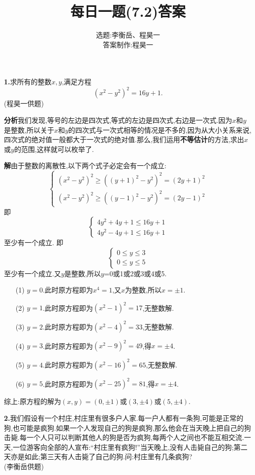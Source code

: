 \documentclass{article}
\title{每日一题(7.2)答案}
\author{选题:李衡岳、程昊一\\答案制作:程昊一}
\begin{document}
\maketitle
{
\textbf{1.}求所有的整数$x,y$,满足方程
\[(x^2-y^2)^2=16y+1.\]
(程昊一供题)}
\par\textbf{分析}\quad 我们发现,等号的左边是四次式,等式的左边是四次式,右边是一次式.因为$x$和$y$是整数,所以关于$x$和$y$的四次式与一次式相等的情况是不多的,因为从大小关系来说,四次式的绝对值一般都大于一次式的绝对值.那么,我们运用\textbf{不等估计}的方法,求出$x$或$y$的范围,这样就可以枚举了.
\par\textbf{解}\quad 由于整数的离散性,以下两个式子必定会有一个成立:
\[\begin{cases}
\left(x^2-y^2\right)^2\ge\left((y+1)^2-y^2\right)^2=(2y+1)^2\\
\left(x^2-y^2\right)^2\ge\left((y-1)^2-y^2\right)^2=(2y-1)^2
\end{cases}\]
即
\[\begin{cases}
4y^2+4y+1\le 16y+1\\
4y^2-4y+1\le 16y+1
\end{cases}\]
至少有一个成立.
即
\[\begin{cases}
0\le y\le 3\\
0\le y\le 5
\end{cases}\]
至少有一个成立.又$y$是整数,所以$y$=0或1或2或3或4或5.
\begin{itemize}
	\item[(1)]$y=0$.此时原方程即为$x^4=1$,又$x$为整数,所以$x=\pm1$.
	\item[(2)]$y=1$.此时原方程即为$(x^2-1)^2=17$,无整数解.
	\item[(3)]$y=2$.此时原方程即为$(x^2-4)^2=33$,无整数解.
	\item[(4)]$y=3$.此时原方程即为$(x^2-9)^2=49$,得$x=\pm4$.
	\item[(5)]$y=4$.此时原方程即为$(x^2-16)^2=65$,无整数解.
	\item[(6)]$y=5$.此时原方程即为$(x^2-25)^2=81$,得$x=\pm4$.
\end{itemize}
\par 综上:原方程的解为$(x,y)=(0,\pm1)$或$(3,\pm4)$或$(5, \pm4)$.\\
{
\par\textbf{2.}我们假设有一个村庄,村庄里有很多户人家.每一户人都有一条狗,可能是正常的狗,也可能是疯狗.如果一个人发现自己的狗是疯狗,那么他会在当天晚上把自己的狗击毙.每一个人只可以判断其他人的狗是否为疯狗,每两个人之间也不能互相交流.一天,一位游客向全部的人宣布:“村庄里有疯狗!”当天晚上,没有人击毙自己的狗;第二天亦是如此;第三天有人击毙了自己的狗.问:村庄里有几条疯狗?\\
(李衡岳供题)}
\end{document}
